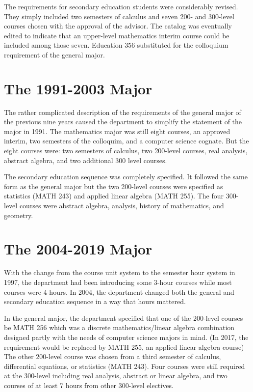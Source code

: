 \documentclass[
]{book}
\begin{document}
The requirements for secondary education students were considerably revised. They simply included two semesters of calculus and seven 200- and 300-level courses chosen with the approval of the advisor. The catalog was eventually edited to indicate that an upper-level mathematics interim course could be included among those seven. Education 356 substituted for the colloquium requirement of the general major.

\hypertarget{the-1991-2003-major}{%
\section{The 1991-2003 Major}\label{the-1991-2003-major}}

The rather complicated description of the requirements of the general major of the previous nine years caused the department to simplify the statement of the major in 1991. The mathematics major was still eight courses, an approved interim, two semesters of the colloquim, and a computer science cognate. But the eight courses were: two semesters of calculus, two 200-level courses, real analysis, abstract algebra, and two additional 300 level courses.

The secondary education sequence was completely specified. It followed the same form as the general major but the two 200-level courses were specified as statistics (MATH 243) and applied linear algebra (MATH 255). The four 300-level courses were abstract algebra, analysis, history of mathematics, and geometry.

\hypertarget{the-2004-2019-major}{%
\section{The 2004-2019 Major}\label{the-2004-2019-major}}

With the change from the course unit system to the semester hour system in 1997, the department had been introducing some 3-hour courses while most courses were 4-hours. In 2004, the department changed both the general and secondary education sequence in a way that hours mattered.

In the general major, the department specified that one of the 200-level courses be MATH 256 which was a discrete mathematics/linear algebra combination designed partly with the needs of computer science majors in mind. (In 2017, the requirement would be replaced by MATH 255, an applied linear algebra course) The other 200-level course was chosen from a third semester of calculus, differential equations, or statistics (MATH 243). Four courses were still required at the 300-level including real analysis, abstract or linear algebra, and two courses of at least 7 hours from other 300-level electives.
\end{document}

